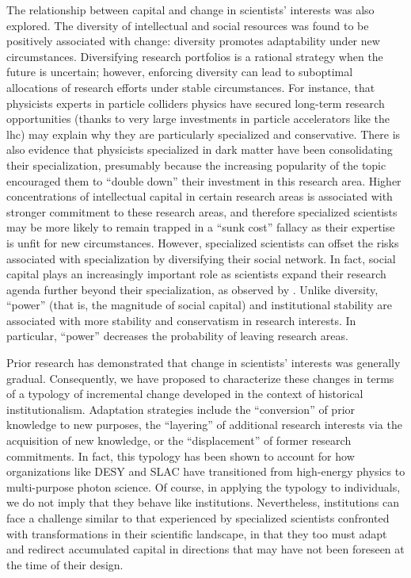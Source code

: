 \documentclass{article}
\begin{document}
The relationship between capital and change in scientists' interests was also explored. The diversity of intellectual and social resources was found to be positively associated with change: diversity promotes adaptability under new circumstances. Diversifying research portfolios is a rational strategy when the future is uncertain; however, enforcing diversity can lead to suboptimal allocations of research efforts under stable circumstances. For instance, that physicists experts in particle colliders physics have secured long-term research opportunities (thanks to very large investments in particle accelerators like the \gls{lhc}) may explain why they are particularly specialized and conservative. There is also evidence that physicists specialized in dark matter have been consolidating their specialization, presumably because the increasing popularity of the topic encouraged them to ``double down'' their investment in this research area. Higher concentrations of intellectual capital in certain research areas is associated with stronger commitment to these research areas, and therefore specialized scientists may be more likely to remain trapped in a ``sunk cost'' fallacy as their expertise is unfit for new circumstances. However, specialized scientists can offset the risks associated with specialization by diversifying their social network. In fact, social capital plays an increasingly important role as scientists expand their research agenda further beyond their specialization, as observed by \citealt{Tripodi2020}. Unlike diversity, ``power'' (that is, the magnitude of social capital) and institutional stability are associated with more stability and conservatism in research interests. In particular, ``power'' decreases the probability of leaving research areas.

Prior research has demonstrated that change in scientists' interests was generally gradual. Consequently, we have proposed to characterize these changes in terms of a typology of incremental change developed in the context of historical institutionalism. Adaptation strategies include the ``conversion'' of prior knowledge to new purposes, the ``layering'' of additional research interests via the acquisition of new knowledge, or the ``displacement'' of former research commitments. In fact, this typology has been shown to account for how organizations like DESY and SLAC have transitioned from high-energy physics to multi-purpose photon science. Of course, in applying the typology to individuals, we do not imply that they behave like institutions. Nevertheless, institutions can face a challenge similar to that experienced by specialized scientists confronted with transformations in their scientific landscape, in that they too must adapt and redirect accumulated capital in directions that may have not been foreseen at the time of their design.
\end{document}
